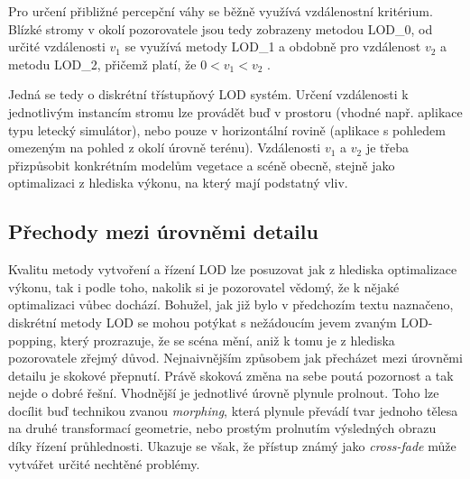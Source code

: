 Pro určení přibližné percepční váhy se běžně využívá vzdálenostní kritérium. Blízké stromy v okolí pozorovatele jsou tedy zobrazeny metodou LOD\_0, od určité vzdálenosti $v_1$ se využívá metody LOD\_1 a obdobně pro vzdálenost $v_2$ a metodu LOD\_2, přičemž platí, že $0<v_1<v_2$ .

Jedná se tedy o diskrétní třístupňový LOD systém. Určení vzdálenosti k jednotlivým instancím stromu lze provádět buď v prostoru (vhodné např. aplikace typu letecký simulátor), nebo pouze v horizontální rovině (aplikace s pohledem omezeným na pohled z okolí úrovně terénu). Vzdálenosti $v_1$ a $v_2$ je třeba přizpůsobit konkrétním modelům vegetace a scéně obecně, stejně jako optimalizaci z hlediska výkonu, na který mají podstatný vliv.


\subsection{Přechody mezi úrovněmi detailu}
\label{sec-LODtransitions}
Kvalitu metody vytvoření a řízení LOD lze posuzovat jak z hlediska optimalizace výkonu, tak i podle toho, nakolik si je pozorovatel vědomý, že k nějaké optimalizaci vůbec dochází. Bohužel, jak již bylo v předchozím textu naznačeno, diskrétní metody LOD se mohou potýkat s nežádoucím jevem zvaným LOD-popping, který prozrazuje, že se scéna mění, aniž k tomu je z hlediska pozorovatele zřejmý důvod. Nejnaivnějším způsobem jak přecházet mezi úrovněmi detailu je skokové přepnutí. Právě skoková změna na sebe poutá pozornost a tak nejde o dobré řešní. Vhodnější je jednotlivé úrovně plynule prolnout. Toho lze docílit buď technikou zvanou \emph{morphing}, která plynule převádí tvar jednoho tělesa na druhé transformací geometrie, nebo prostým prolnutím výsledných obrazu díky řízení průhlednosti. Ukazuje se však, že přístup známý jako \emph{cross-fade} může vytvářet určité nechtěné problémy. 



